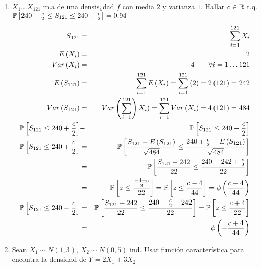 \begin{enumerate}
\item $X_{1} \ldots X_{121}$ m.a de una densis¿dad $f$ con media $2$ y varianza $1$. Hallar $c \in \mathbb{R}$ t.q.
$\mathbb{P} \left[240- \frac{c}{2} \leq S_{121} \leq 240 + \frac{c}{2} \right]= 0.94$
 \begin{eqnarray*}
 S_{121} &=& \sum_{i=1}^{121} X_{i}\\
 E \left(X_{i} \right)&=& 2\\
  Var \left(X_{i} \right)&=& 4 \, \, \, \, \, \, \, \, \, \, \, \, \forall i=1 \ldots 121 \\
  E \left(S_{121} \right)&=& \sum_{i=1}^{121} E \left(X_{i}\right) = \sum_{i=1}^{121} \left(2 \right)= 2 \left(121 \right)= 242\\
  Var \left( S_{121} \right)&=& Var \left( \sum_{i=1}^{121} \right) X_{i})= \sum_{i=1}^{121} Var \left(X_{i} \right)= 4 \left(121 \right)= 484\\
\mathbb{P} \left[S_{121} \leq 240 + \frac{c}{2} \right]&-& \mathbb{P} \left[S_{121} \leq 240-\frac{c}{2} \right]\\
\mathbb{P} \left[S_{121} \leq 240 + \frac{c}{2} \right]&=& \mathbb{P} \left[  \dfrac{S_{121}-E \left( S_{121} \right) }{ \sqrt{484} } \leq \dfrac{240 + \frac{c}{2}- E \left(S_{121} \right)}{\sqrt{484}  }\right]\\
&=& \mathbb{P} \left[ \dfrac{S_{121}- 242}{22} \leq \dfrac{240 - 242 + \frac{c}{2} }{22} \right]\\
&=& \mathbb{P} \left[z \leq \frac{ \frac{-4+c}{2} }{22} \right] = \mathbb{P} \left[ z \leq \frac{c-4}{44} \right] = \phi \left( \frac{c-4}{44} \right)\\
\mathbb{P} \left[S_{121} \leq 240-\frac{c}{2} \right] &=& \mathbb{P} \left[ \dfrac{S_{121} - 242 }{22} \leq \dfrac{240 - \frac{c}{2}-242 }{22} \right] = \mathbb{P} \left[z \leq \frac{c+4}{22} \right]\\
&=& \phi \left(- \frac{c+4}{44} \right)
 \end{eqnarray*}
 \item Sean $X_{1} \sim N \left( 1,3 \right) $, $X_{2} \sim N \left( 0,5 \right) $ ind. Usar función característica para encontra la densidad de $Y=2X_{1}+3X_{2}$
 

\end{enumerate}
